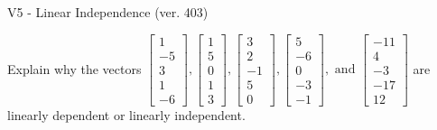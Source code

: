 \begin{exercise}
  \begin{exerciseTitle}V5 - Linear Independence (ver. 403)\end{exerciseTitle}
  \begin{exerciseStatement}
    Explain why the vectors \(\left[\begin{array}{r}
1 \\
-5 \\
3 \\
1 \\
-6
\end{array}\right] , \left[\begin{array}{r}
1 \\
5 \\
0 \\
1 \\
3
\end{array}\right] , \left[\begin{array}{r}
3 \\
2 \\
-1 \\
5 \\
0
\end{array}\right] , \left[\begin{array}{r}
5 \\
-6 \\
0 \\
-3 \\
-1
\end{array}\right] , \text{ and } \left[\begin{array}{r}
-11 \\
4 \\
-3 \\
-17 \\
12
\end{array}\right]\) are linearly dependent or linearly independent.	



\end{exerciseStatement}
\end{exercise}
